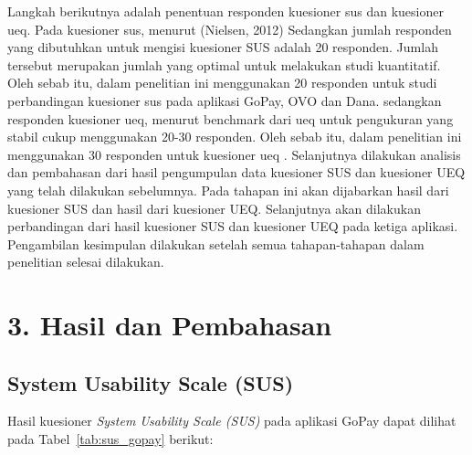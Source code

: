 \documentclass[
 manuscript=article,  %
  layout=publish, 
  year=2024, 
  month= Februari, %
  volume=8,
  number=1 
]{JIKO}
\begin{document}
Langkah berikutnya adalah penentuan responden kuesioner sus dan kuesioner ueq. Pada kuesioner sus, menurut (Nielsen, 2012) Sedangkan jumlah responden yang dibutuhkan untuk mengisi kuesioner SUS adalah 20 responden. Jumlah tersebut merupakan jumlah yang optimal untuk melakukan studi kuantitatif. Oleh sebab itu, dalam penelitian ini menggunakan 20 responden untuk studi perbandingan kuesioner sus pada aplikasi GoPay, OVO dan Dana. sedangkan responden kuesioner ueq, menurut benchmark dari ueq untuk pengukuran yang stabil cukup menggunakan 20-30 responden. Oleh sebab itu, dalam penelitian ini menggunakan 30 responden untuk kuesioner ueq \cite{5}. 
Selanjutnya dilakukan analisis dan pembahasan dari hasil pengumpulan data kuesioner SUS dan kuesioner UEQ yang telah dilakukan sebelumnya. Pada tahapan ini akan dijabarkan hasil dari kuesioner SUS dan hasil dari kuesioner UEQ. Selanjutnya akan dilakukan perbandingan dari hasil kuesioner SUS dan kuesioner UEQ pada ketiga aplikasi. Pengambilan kesimpulan dilakukan setelah semua tahapan-tahapan dalam penelitian selesai dilakukan\cite{13}.

\section{3.	Hasil dan Pembahasan}

\subsection{System Usability Scale (SUS)}

Hasil kuesioner \textit{System Usability Scale (SUS)} pada aplikasi GoPay dapat dilihat pada Tabel~\ref{tab:sus_gopay} berikut:
\usepackage{graphicx}
\end{document}
